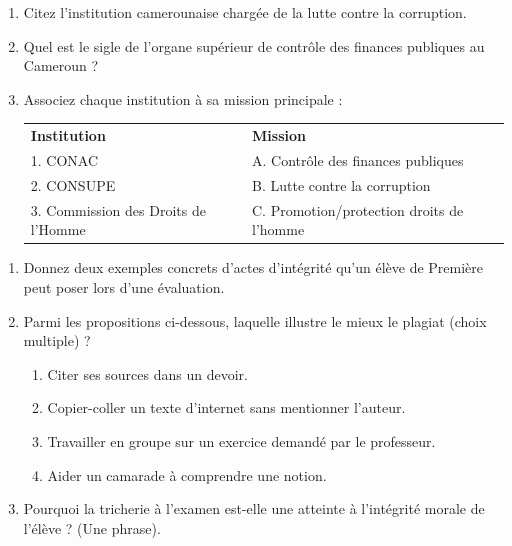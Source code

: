 \documentclass[11pt]{article}
\begin{document}
\begin{exercice}
\begin{enumerate}
    \item Citez l'institution camerounaise chargée de la lutte contre la corruption.
    \item Quel est le sigle de l'organe supérieur de contrôle des finances publiques au Cameroun ?
    \item Associez chaque institution à sa mission principale :
    \begin{tabular}{ll}
        \textbf{Institution} & \textbf{Mission} \\
        1. CONAC & A. Contrôle des finances publiques \\
        2. CONSUPE & B. Lutte contre la corruption \\
        3. Commission des Droits de l'Homme & C. Promotion/protection droits de l'homme \\
    \end{tabular}
\end{enumerate}
\end{exercice}

\begin{exercice}
\begin{enumerate}
    \item Donnez deux exemples concrets d'actes d'intégrité qu'un élève de Première peut poser lors d'une évaluation.
    \item Parmi les propositions ci-dessous, laquelle illustre le mieux le plagiat (choix multiple) ?
    \begin{enumerate}
        \item Citer ses sources dans un devoir.
        \item Copier-coller un texte d'internet sans mentionner l'auteur.
        \item Travailler en groupe sur un exercice demandé par le professeur.
        \item Aider un camarade à comprendre une notion.
    \end{enumerate}
    \item Pourquoi la tricherie à l'examen est-elle une atteinte à l'intégrité morale de l'élève ? (Une phrase).
\end{enumerate}
\end{exercice}
\end{document}
